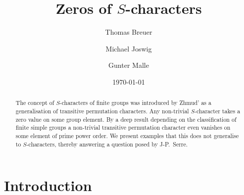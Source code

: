 \documentclass[12pt,leqno,a4paper]{amsart}
\theoremstyle{definition}
\begin{document}
\title{Zeros of $S$-characters}

\author{Thomas Breuer}
\address{Lehrstuhl f\"ur Algebra und Zahlentheorie, RWTH Aachen University,
  Pontdriesch 14/16, 52062 Aachen, Germany.}

\author{Michael Joswig}
\address{Chair of Discrete Mathematics/Geometry, Technische Universit\"at
  Berlin, Germany.}

\author{Gunter Malle}
\address{FB Mathematik, RPTU, Postfach 3049, 67653 Kaisers\-lautern, Germany.}

\begin{abstract}
The concept of $S$-characters of finite groups was introduced by Zhmud' as a
generalisation of transitive permutation characters. Any non-trivial
$S$-character takes a zero value on some group element. By a deep result
depending on the classification of finite simple groups a non-trivial transitive
permutation character even vanishes on some element of prime power order.
We present examples that this does not generalise to $S$-characters, thereby
answering a question posed by J-P.\ Serre.
\end{abstract}



\date{\today}

\maketitle

\pagestyle{myheadings}


\section{Introduction}
\label{sec:intro}
\end{document}
